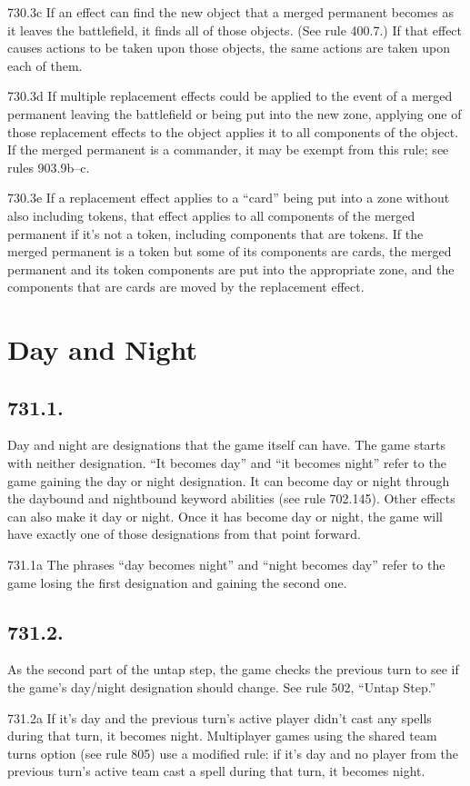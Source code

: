 730.3c If an effect can find the new object that a merged permanent becomes as it leaves the battlefield, it finds all of those objects. (See rule 400.7.) If that effect causes actions to be taken upon those objects, the same actions are taken upon each of them.

730.3d If multiple replacement effects could be applied to the event of a merged permanent leaving the battlefield or being put into the new zone, applying one of those replacement effects to the object applies it to all components of the object. If the merged permanent is a commander, it may be exempt from this rule; see rules 903.9b–c.

730.3e If a replacement effect applies to a “card” being put into a zone without also including tokens, that effect applies to all components of the merged permanent if it’s not a token, including components that are tokens. If the merged permanent is a token but some of its components are cards, the merged permanent and its token components are put into the appropriate zone, and the components that are cards are moved by the replacement effect.

\section{Day and Night}
\subsection*{731.1.}
Day and night are designations that the game itself can have. The game starts with neither designation. “It becomes day” and “it becomes night” refer to the game gaining the day or night designation. It can become day or night through the daybound and nightbound keyword abilities (see rule 702.145). Other effects can also make it day or night. Once it has become day or night, the game will have exactly one of those designations from that point forward.

731.1a The phrases “day becomes night” and “night becomes day” refer to the game losing the first designation and gaining the second one.

\subsection*{731.2.}
As the second part of the untap step, the game checks the previous turn to see if the game’s day/night designation should change. See rule 502, “Untap Step.”

731.2a If it’s day and the previous turn’s active player didn’t cast any spells during that turn, it becomes night. Multiplayer games using the shared team turns option (see rule 805) use a modified rule: if it’s day and no player from the previous turn’s active team cast a spell during that turn, it becomes night.

